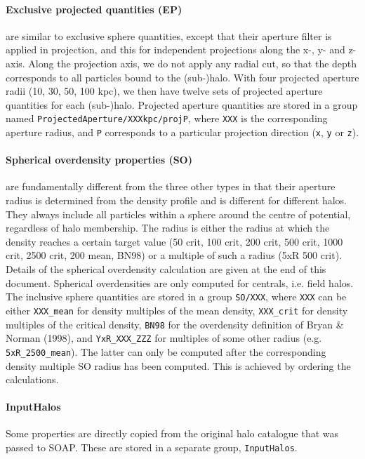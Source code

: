 \documentclass{article}
\begin{document}
\paragraph{Exclusive projected quantities (EP)} are similar to exclusive sphere quantities, except that their 
aperture filter is applied in projection, and this for independent projections along the x-, y- and z-axis. 
Along the projection axis, we do not apply any radial cut, so that the depth corresponds to all particles 
bound to the (sub-)halo. With four projected aperture radii (10, 30, 50, 100 kpc), we then have twelve sets of 
projected aperture quantities for each (sub-)halo. Projected aperture quantities are stored in a group named 
\verb+ProjectedAperture/XXXkpc/projP+, where \verb+XXX+ is the corresponding aperture radius, and \verb+P+ 
corresponds to a particular projection direction (\verb+x+, \verb+y+ or \verb+z+).

\paragraph{Spherical overdensity properties (SO)} are fundamentally different from the three other types in 
that their aperture radius is determined from the density profile and is different for different halos. They 
always include all particles within a sphere around the centre of potential, regardless of halo membership. 
The radius is either the radius at which the density reaches a certain target value (50 crit, 100 crit, 200 
crit, 500 crit, 1000 crit, 2500 crit, 200 mean, BN98) or a multiple of such a radius (5xR 500 crit). Details 
of the spherical overdensity calculation are given at the end of this document. Spherical overdensities are 
only computed for centrals, i.e. field halos. The inclusive sphere quantities are stored in a group 
\verb+SO/XXX+, where \verb+XXX+ can be either \verb+XXX_mean+ for density multiples of the mean density, 
\verb+XXX_crit+ for density multiples of the critical density, \verb+BN98+ for the overdensity definition of 
Bryan \& Norman (1998), and \verb+YxR_XXX_ZZZ+ for multiples of some other radius (e.g. \verb+5xR_2500_mean+). 
The latter can only be computed after the corresponding density multiple SO radius has been computed. This is 
achieved by ordering the calculations.

\paragraph{InputHalos} Some properties are directly copied from the original halo catalogue that was passed
to SOAP. These are stored in a separate group, \verb+InputHalos+.
\end{document}
